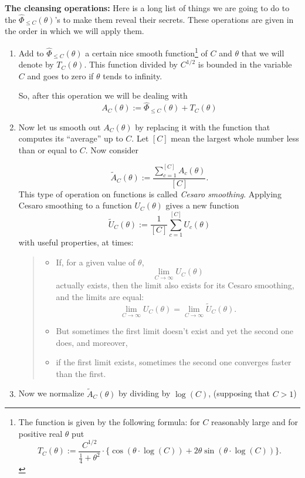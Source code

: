 \documentclass[openany]{book}
\theoremstyle{plain}
\theoremstyle{definition}
\begin{document}
{\bf The cleansing operations:} Here is a long list of things we are
going to do to the ${\hat\Phi}_{\le C}(\theta)$'s to make them reveal
their secrets. These operations are given in the order in which we
will apply them.  \vskip20pt

\begin{enumerate} \item Add to ${\hat\Phi}_{\le C}(\theta)$ a certain
  nice smooth function{\footnote{ The function is given by the
      following formula: for $C$ reasonably large and for positive
      real $\theta$ put $$T_C(\theta):=
      {\frac{C^{1/2}}{{\frac{1}{4}}+\theta^2}}\cdot\big\{\cos(\theta\cdot\log(C))+2\theta\sin(\theta\cdot
      \log(C))\big\}.$$}} of $C$ and $\theta$ that we will denote by
  $T_C(\theta)$. This function divided by $C^{1/2}$ is bounded in the
  variable $C$ and goes to zero if $\theta$ tends to infinity.

 So, after this operation we will be dealing with  $$A_C(\theta):= {\hat\Phi}_{\le C}(\theta) +T_C(\theta)$$
 
  \vskip20pt\item Now let us smooth out $A_C(\theta)$ by replacing it with the function that computes its ``average'' up to $C$. Let ${[C]}$ mean the largest whole number less than or equal to $C$.    Now consider
 
 $${\tilde A}_C(\theta):= {\frac{\sum_{c=1}^{[C]} A_c(\theta)}{[C]}}.$$  This type of operation on  functions is called {\it Cesaro smoothing}. Applying Cesaro smoothing to a function $U_C(\theta)$ gives a new function $${\tilde U}_C(\theta):=  {\frac{1}{[C]}}\sum_{c=1}^{[C]} U_c(\theta)$$  with useful properties, at times:
 \begin{quote} \begin{itemize}\item If, for a given value of
     $\theta$, $${\lim_{C \to \infty}} U_C(\theta)$$ actually exists,
     then the limit also exists for its Cesaro smoothing, and the
     limits are equal: $${\lim_{C \to \infty}} U_C(\theta)= {\lim_{C
         \to \infty}} {\tilde U}_C(\theta).$$ \item But sometimes the
     first limit doesn't exist and yet the second one does, and
     moreover, \item if the first limit exists, sometimes the second
     one converges faster than the first. \end{itemize} \end{quote}
 \vskip20pt\item Now we normalize ${\tilde A}_C(\theta)$ by dividing
 by $\log(C)$, (supposing that $C >1$)
 

\end{enumerate}
\end{document}
